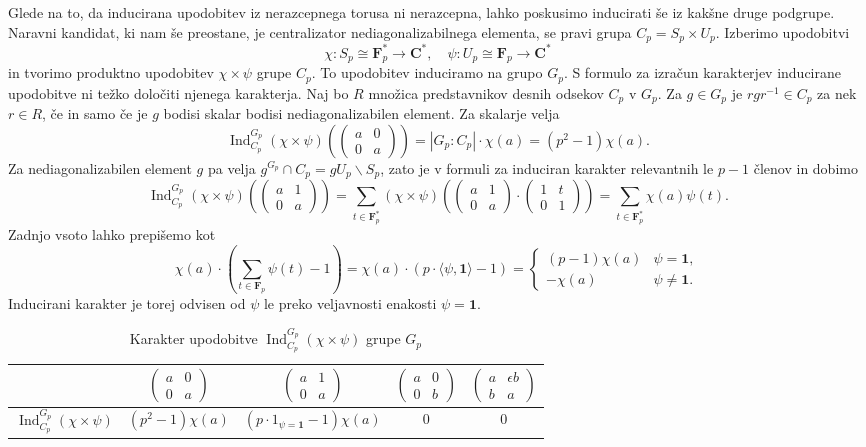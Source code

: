 \documentclass[11pt]{book}
\def\CC{\mathbf{C}}
\def\oneone{\mathbf{1}}
\def\FF{\mathbf{F}}
\DeclareMathOperator\Ind{Ind}
\newcommand{\mat}[4]{\left(\begin{smallmatrix}#1&#2\\#3&#4\end{smallmatrix}\right)}
\theoremstyle{definition}
\theoremstyle{zgled}
\theoremstyle{zgledbrezstevilke}
\theoremstyle{odprtproblem}
\theoremstyle{domacanaloga}
\theoremstyle{izrek}
\begin{document}
Glede na to, da inducirana upodobitev iz nerazcepnega torusa ni nerazcepna, lahko poskusimo inducirati še iz kakšne druge podgrupe. Naravni kandidat, ki nam še preostane, je centralizator nediagonalizabilnega elementa, se pravi grupa $C_p = S_p \times U_p$. Izberimo upodobitvi
\[
    \chi \colon S_p \cong \FF_p^* \to \CC^*, \quad
    \psi \colon U_p \cong \FF_p \to \CC^*
\]
in tvorimo produktno upodobitev $\chi \times \psi$ grupe $C_p$. To upodobitev induciramo na grupo $G_p$. S formulo za izračun karakterjev inducirane upodobitve ni težko določiti njenega karakterja. Naj bo $R$ množica predstavnikov desnih odsekov $C_p$ v $G_p$. Za $g \in G_p$ je $r g r^{-1} \in C_p$ za nek $r \in R$, če in samo če je $g$ bodisi skalar bodisi nediagonalizabilen element. Za skalarje velja
\[
    {\textstyle \Ind_{C_p}^{G_p}(\chi \times \psi) } \left( \begin{pmatrix} a & 0 \\ 0 & a \end{pmatrix} \right)
    = |G_p : C_p| \cdot \chi(a) = (p^2 - 1) \chi(a).
\]
Za nediagonalizabilen element $g$ pa velja $g^{G_p} \cap C_p = g U_p \backslash S_p$, zato je v formuli za induciran karakter relevantnih le $p-1$ členov in dobimo
\[
    {\textstyle \Ind_{C_p}^{G_p}(\chi \times \psi)} \left( \begin{pmatrix} a & 1 \\ 0 & a \end{pmatrix} \right)
    = \sum_{t \in \FF_p^*} (\chi \times \psi) \left( \begin{pmatrix} a & 1 \\ 0 & a \end{pmatrix} \cdot \begin{pmatrix} 1 & t \\ 0 & 1 \end{pmatrix} \right)
    = \sum_{t \in \FF_p^*} \chi(a) \psi(t).
\]
Zadnjo vsoto lahko prepišemo kot
\[
    \chi(a) \cdot \left( \sum_{t \in \FF_p} \psi(t) - 1 \right)
    = \chi(a) \cdot \left( p \cdot \langle \psi, \oneone \rangle - 1 \right)
    = \begin{cases}
        (p-1) \chi(a) & \psi = \oneone, \\
        - \chi(a) & \psi \neq \oneone.
    \end{cases}
\]
Inducirani karakter je torej odvisen od $\psi$ le preko veljavnosti enakosti $\psi = \oneone$.

\begin{table}[ht]
    \centering
\begin{tabular}{l|*{4}{c}}
    & 
    $\mat{a}{0}{0}{a}$
    &
    $\mat{a}{1}{0}{a}$
    &
    $\mat{a}{0}{0}{b}$
    &
    $\mat{a}{\epsilon b}{b}{a}$ \\ \hline
    $\Ind_{C_p}^{G_p}(\chi \times \psi)$ & $(p^2 - 1) \chi(a)$ & $(p \cdot 1_{\psi = \oneone} - 1) \chi(a)$ & $0$ & $0$ \\
\end{tabular}
\caption{Karakter upodobitve $\Ind_{C_p}^{G_p}(\chi \times \psi)$ grupe $G_p$}
\end{table}
\end{document}
